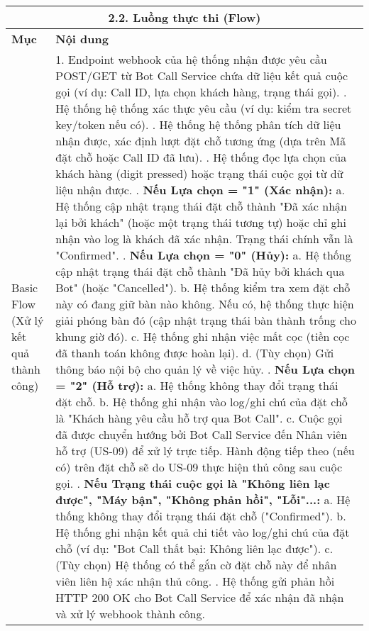 \begin{longtable}{|m{4cm}|p{11cm}|}
\hline
\multicolumn{2}{|c|}{\textbf{2.2. Luồng thực thi (Flow)}} \\
\hline
\textbf{Mục} & \textbf{Nội dung} \\
\hline
Basic Flow (Xử lý kết quả thành công) & 1. Endpoint webhook của hệ thống nhận được yêu cầu POST/GET từ Bot Call Service chứa dữ liệu kết quả cuộc gọi (ví dụ: Call ID, lựa chọn khách hàng, trạng thái gọi). \newline 2. Hệ thống hệ thống xác thực yêu cầu (ví dụ: kiểm tra secret key/token nếu có). \newline 3. Hệ thống hệ thống phân tích dữ liệu nhận được, xác định lượt đặt chỗ tương ứng (dựa trên Mã đặt chỗ hoặc Call ID đã lưu). \newline 4. Hệ thống đọc lựa chọn của khách hàng (digit pressed) hoặc trạng thái cuộc gọi từ dữ liệu nhận được. \newline 5. \textbf{Nếu Lựa chọn = "1" (Xác nhận):} \newline    a. Hệ thống cập nhật trạng thái đặt chỗ thành "Đã xác nhận lại bởi khách" (hoặc một trạng thái tương tự) hoặc chỉ ghi nhận vào log là khách đã xác nhận. Trạng thái chính vẫn là "Confirmed". \newline 6. \textbf{Nếu Lựa chọn = "0" (Hủy):} \newline    a. Hệ thống cập nhật trạng thái đặt chỗ thành "Đã hủy bởi khách qua Bot" (hoặc "Cancelled"). \newline    b. Hệ thống kiểm tra xem đặt chỗ này có đang giữ bàn nào không. Nếu có, hệ thống thực hiện giải phóng bàn đó (cập nhật trạng thái bàn thành trống cho khung giờ đó). \newline    c. Hệ thống ghi nhận việc mất cọc (tiền cọc đã thanh toán không được hoàn lại). \newline    d. (Tùy chọn) Gửi thông báo nội bộ cho quản lý về việc hủy. \newline 7. \textbf{Nếu Lựa chọn = "2" (Hỗ trợ):} \newline    a. Hệ thống không thay đổi trạng thái đặt chỗ. \newline    b. Hệ thống ghi nhận vào log/ghi chú của đặt chỗ là "Khách hàng yêu cầu hỗ trợ qua Bot Call". \newline    c. Cuộc gọi đã được chuyển hướng bởi Bot Call Service đến Nhân viên hỗ trợ (US-09) để xử lý trực tiếp. Hành động tiếp theo (nếu có) trên đặt chỗ sẽ do US-09 thực hiện thủ công sau cuộc gọi. \newline 8. \textbf{Nếu Trạng thái cuộc gọi là "Không liên lạc được", "Máy bận", "Không phản hồi", "Lỗi"...:} \newline    a. Hệ thống không thay đổi trạng thái đặt chỗ ("Confirmed"). \newline    b. Hệ thống ghi nhận kết quả chi tiết vào log/ghi chú của đặt chỗ (ví dụ: "Bot Call thất bại: Không liên lạc được"). \newline    c. (Tùy chọn) Hệ thống có thể gắn cờ đặt chỗ này để nhân viên liên hệ xác nhận thủ công. \newline 9. Hệ thống gửi phản hồi HTTP 200 OK cho Bot Call Service để xác nhận đã nhận và xử lý webhook thành công. \newline 
\end{longtable}
